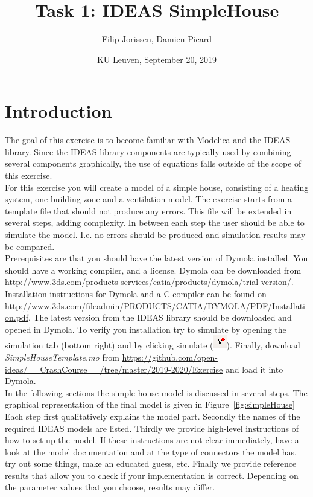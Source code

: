 \documentclass[10pt,a4paper]{article}
\begin{document}
\title{Task 1: IDEAS SimpleHouse}
\author{Filip Jorissen, Damien Picard}
\date{KU Leuven, September 20, 2019}
\maketitle

\section*{Introduction}
The goal of this exercise is to become familiar with 
Modelica and the IDEAS library. 
Since the IDEAS library components are typically used
by combining several components graphically, the use of 
equations falls outside of the scope of this exercise.\\

For this exercise you will create a model of a simple house,
consisting of a heating system, one building zone 
and a ventilation model. 
The exercise starts from a template file that should 
not produce any errors. This file will be extended in
several steps, adding complexity.
In between each step the user should be able to simulate the
model. I.e. no errors should be produced and simulation results 
may be compared.\\

Prerequisites are that you should have the latest version of Dymola
installed. You should have a working compiler, and a license. 
Dymola can be downloaded from 
\url{http://www.3ds.com/products-services/catia/products/dymola/trial-version/}. 
Installation instructions for Dymola and a C-compiler can be found on 
\url{http://www.3ds.com/fileadmin/PRODUCTS/CATIA/DYMOLA/PDF/Installation.pdf}.
The latest version from the IDEAS library should be downloaded and opened in Dymola. 
To verify you installation try to simulate  by opening the simulation tab (bottom right) and by clicking simulate (\includegraphics[scale=0.5]{simulate.png}). Finally, download 
\textit{SimpleHouseTemplate.mo} from \url{https://github.com/open-ideas/__CrashCourse__/tree/master/2019-2020/Exercise}
and load it into Dymola.\\

In the following sections the simple house model is discussed 
in several steps. The graphical representation of the final model is 
given in Figure~\ref{fig:simpleHouse}
Each step first qualitatively explains the model part.
Secondly the names of the required IDEAS models 
are listed.
Thirdly we provide high-level instructions of how to
set up the model.
If these instructions are not clear immediately, 
have a look at the model documentation and at the type of
connectors the model has, 
try out some things, 
make an educated guess, etc.
Finally we provide reference results that allow you to check
if your implementation is correct. 
Depending on the parameter values that you choose, results
may differ.
 
\end{document}
